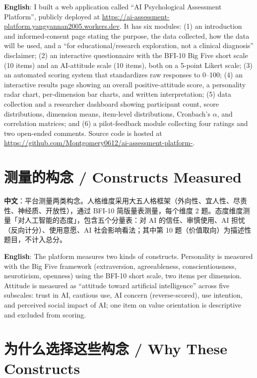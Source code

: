 \documentclass[11pt,a4paper]{ctexart}
\begin{document}
\medskip

\noindent\textbf{English}: I built a web application called ``AI Psychological Assessment Platform'', publicly deployed at \url{https://ai-assessment-platform.yangyannan2005.workers.dev}. It has six modules: (1) an introduction and informed-consent page stating the purpose, the data collected, how the data will be used, and a ``for educational/research exploration, not a clinical diagnosis'' disclaimer; (2) an interactive questionnaire with the BFI-10 Big Five short scale (10 items) and an AI-attitude scale (10 items), both on a 5-point Likert scale; (3) an automated scoring system that standardizes raw responses to 0--100; (4) an interactive results page showing an overall positive-attitude score, a personality radar chart, per-dimension bar charts, and written interpretation; (5) data collection and a researcher dashboard showing participant count, score distributions, dimension means, item-level distributions, Cronbach's $\alpha$, and correlation matrices; and (6) a pilot-feedback module collecting four ratings and two open-ended comments. Source code is hosted at \url{https://github.com/Montgomery0612/ai-assessment-platform-}.

\section{测量的构念 / Constructs Measured}

\noindent\textbf{中文}：平台测量两类构念。人格维度采用大五人格框架（外向性、宜人性、尽责性、神经质、开放性），通过 BFI-10 简版量表测量，每个维度 2 题。态度维度测量「对人工智能的态度」，包含五个分量表：对 AI 的信任、审慎使用、AI 担忧（反向计分）、使用意愿、AI 社会影响看法；其中第 10 题（价值取向）为描述性题目，不计入总分。

\medskip

\noindent\textbf{English}: The platform measures two kinds of constructs. Personality is measured with the Big Five framework (extraversion, agreeableness, conscientiousness, neuroticism, openness) using the BFI-10 short scale, two items per dimension. Attitude is measured as ``attitude toward artificial intelligence'' across five subscales: trust in AI, cautious use, AI concern (reverse-scored), use intention, and perceived social impact of AI; one item on value orientation is descriptive and excluded from scoring.

\section{为什么选择这些构念 / Why These Constructs}
\end{document}
